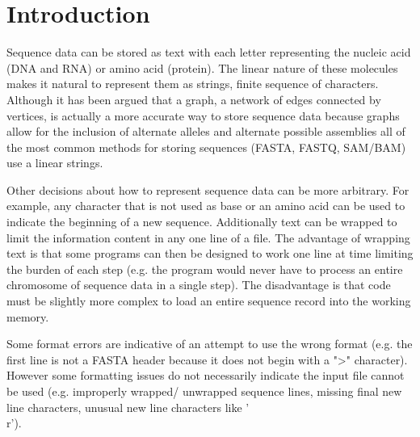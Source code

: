 \section{Introduction}

Sequence data can be stored as text with each letter representing the nucleic acid (DNA and RNA) or amino acid (protein). The linear nature of these molecules makes it natural to represent them as strings, finite sequence of characters. Although it has been argued that  a graph, a network of edges connected by vertices, is actually a more accurate way to store sequence data because graphs allow for the inclusion of alternate alleles and alternate possible assemblies all of the most common methods for storing sequences (FASTA, FASTQ, SAM/BAM) use a linear strings.

Other decisions about how to represent sequence data can be more arbitrary. For example, any character that is not used as base or an amino acid can be used to indicate the beginning of a new sequence. Additionally text can be wrapped to limit the information content in any one line of a file. The advantage of wrapping text is that some programs can then be designed to work one line at time limiting the burden of each step (e.g. the program would never have to process an entire chromosome of sequence data in a single step). The disadvantage is that code must be slightly more complex to load an entire sequence record into the working memory.

Some format errors are indicative of an attempt to use the wrong format (e.g. the first line is not a FASTA header because it does not begin with a ">" character). However some formatting issues do not necessarily indicate the input file cannot be used (e.g. improperly wrapped/ unwrapped sequence lines, missing final new line characters, unusual new line characters like '\\r').